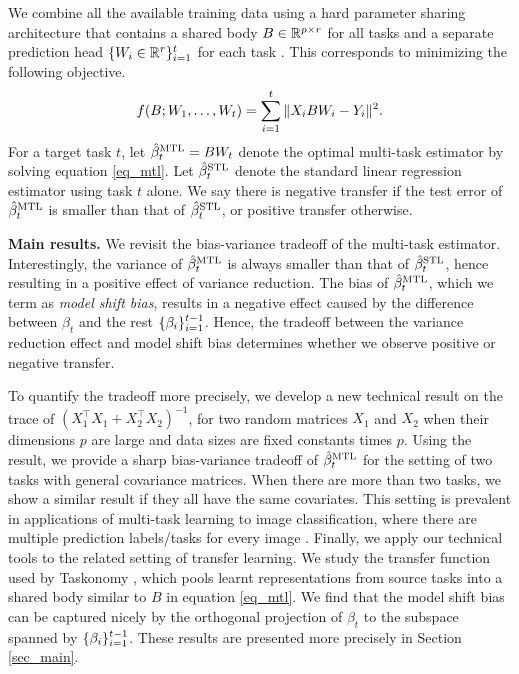 We combine all the available training data using a hard parameter sharing architecture that contains a shared body $B\in\mathbb{R}^{p\times r}$ for all tasks and a separate prediction head $\{W_i \in \mathbb{R}^{r}\}_{i=1}^t$ for each task \cite{R17,MTDNN19,WZR20}.
This corresponds to minimizing the following objective.
\begin{align}
	\label{eq_mtl}
	f(B; W_1, \dots, W_t) = \sum_{i=1}^t \|X_i B W_i - Y_i\|^2.
\end{align}
For a target task $t$,
let $\hat{\beta}_t^{\text{MTL}} = B W_t$ denote the optimal multi-task estimator by solving equation \eqref{eq_mtl}.
Let $\hat{\beta}_t^{\text{STL}}$ denote the standard linear regression estimator using task $t$ alone.
We say there is negative transfer if the test error of $\hat{\beta}_t^{\text{MTL}}$  is smaller than that of $\hat{\beta}_t^{\text{STL}}$, or positive transfer otherwise.

\textbf{Main results.}
We revisit the bias-variance tradeoff of the multi-task estimator.
Interestingly, the variance of $\hat{\beta}_t^{\text{MTL}}$ is always smaller than that of $\hat{\beta}_t^{\text{STL}}$, hence resulting in a positive effect of variance reduction.
The bias of $\hat{\beta}_t^{\text{MTL}}$, which we term as \textit{model shift bias}, results in a negative effect caused by the difference between $\beta_t$ and the rest $\{\beta_i\}_{i=1}^{t-1}$.
Hence, the tradeoff between the variance reduction effect and model shift bias determines whether we observe positive or negative transfer.

To quantify the tradeoff more precisely, we develop a new technical result on the trace of $(X_1^{\top}X_1 + X_2^{\top}X_2)^{-1}$, for two random matrices $X_1$ and $X_2$ when their dimensions $p$ are large and data sizes are fixed constants times $p$.
Using the result, we provide a sharp bias-variance tradeoff of $\hat{\beta}_t^{\text{MTL}}$ for the setting of two tasks with general covariance matrices.
When there are more than two tasks, we show a similar result if they all have the same covariates.
This setting is prevalent in applications of multi-task learning to image classification, where there are multiple prediction labels/tasks for every image \cite{chexnet17,EA20}.
Finally, we apply our technical tools to the related setting of transfer learning.
We study the transfer function used by Taskonomy \cite{ZSSGM18}, which pools learnt representations from source tasks into a shared body similar to $B$ in equation \eqref{eq_mtl}.
We find that the model shift bias can be captured nicely by the orthogonal projection of $\beta_t$ to the subspace spanned by $\{\beta_i\}_{i=1}^{t-1}$.
These results are presented more precisely in Section \ref{sec_main}.

